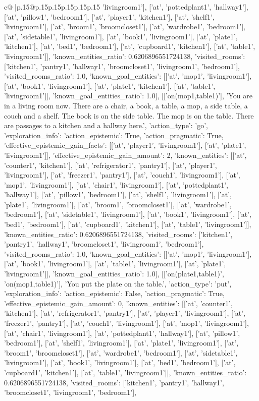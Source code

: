 \documentclass{article}
\begin{document}
{\begin{supertabular}{c@{$\;$}|p{.15\linewidth}@{}p{.15\linewidth}p{.15\linewidth}p{.15\linewidth}p{.15\linewidth}p{.15\linewidth}}
{{{'livingroom1'], ['at', 'pottedplant1', 'hallway1'], ['at', 'pillow1', 'bedroom1'], ['at', 'player1', 'kitchen1'], ['at', 'shelf1', 'livingroom1'], ['at', 'broom1', 'broomcloset1'], ['at', 'wardrobe1', 'bedroom1'], ['at', 'sidetable1', 'livingroom1'], ['at', 'book1', 'livingroom1'], ['at', 'plate1', 'kitchen1'], ['at', 'bed1', 'bedroom1'], ['at', 'cupboard1', 'kitchen1'], ['at', 'table1', 'livingroom1']], 'known_entities_ratio': 0.6206896551724138, 'visited_rooms': ['kitchen1', 'pantry1', 'hallway1', 'broomcloset1', 'livingroom1', 'bedroom1'], 'visited_rooms_ratio': 1.0, 'known_goal_entities': [['at', 'mop1', 'livingroom1'], ['at', 'book1', 'livingroom1'], ['at', 'plate1', 'kitchen1'], ['at', 'table1', 'livingroom1']], 'known_goal_entities_ratio': 1.0}}], [['on(mop1,table1)'], 'You are in a living room now. There are a chair, a book, a table, a mop, a side table, a couch and a shelf. The book is on the side table. The mop is on the table. There are passages to a kitchen and a hallway here.', {'action_type': 'go', 'exploration_info': {'action_epistemic': True, 'action_pragmatic': True, 'effective_epistemic_gain_facts': [['at', 'player1', 'livingroom1'], ['at', 'plate1', 'livingroom1']], 'effective_epistemic_gain_amount': 2, 'known_entities': [['at', 'counter1', 'kitchen1'], ['at', 'refrigerator1', 'pantry1'], ['at', 'player1', 'livingroom1'], ['at', 'freezer1', 'pantry1'], ['at', 'couch1', 'livingroom1'], ['at', 'mop1', 'livingroom1'], ['at', 'chair1', 'livingroom1'], ['at', 'pottedplant1', 'hallway1'], ['at', 'pillow1', 'bedroom1'], ['at', 'shelf1', 'livingroom1'], ['at', 'plate1', 'livingroom1'], ['at', 'broom1', 'broomcloset1'], ['at', 'wardrobe1', 'bedroom1'], ['at', 'sidetable1', 'livingroom1'], ['at', 'book1', 'livingroom1'], ['at', 'bed1', 'bedroom1'], ['at', 'cupboard1', 'kitchen1'], ['at', 'table1', 'livingroom1']], 'known_entities_ratio': 0.6206896551724138, 'visited_rooms': ['kitchen1', 'pantry1', 'hallway1', 'broomcloset1', 'livingroom1', 'bedroom1'], 'visited_rooms_ratio': 1.0, 'known_goal_entities': [['at', 'mop1', 'livingroom1'], ['at', 'book1', 'livingroom1'], ['at', 'table1', 'livingroom1'], ['at', 'plate1', 'livingroom1']], 'known_goal_entities_ratio': 1.0}}], [['on(plate1,table1)', 'on(mop1,table1)'], 'You put the plate on the table.', {'action_type': 'put', 'exploration_info': {'action_epistemic': False, 'action_pragmatic': True, 'effective_epistemic_gain_amount': 0, 'known_entities': [['at', 'counter1', 'kitchen1'], ['at', 'refrigerator1', 'pantry1'], ['at', 'player1', 'livingroom1'], ['at', 'freezer1', 'pantry1'], ['at', 'couch1', 'livingroom1'], ['at', 'mop1', 'livingroom1'], ['at', 'chair1', 'livingroom1'], ['at', 'pottedplant1', 'hallway1'], ['at', 'pillow1', 'bedroom1'], ['at', 'shelf1', 'livingroom1'], ['at', 'plate1', 'livingroom1'], ['at', 'broom1', 'broomcloset1'], ['at', 'wardrobe1', 'bedroom1'], ['at', 'sidetable1', 'livingroom1'], ['at', 'book1', 'livingroom1'], ['at', 'bed1', 'bedroom1'], ['at', 'cupboard1', 'kitchen1'], ['at', 'table1', 'livingroom1']], 'known_entities_ratio': 0.6206896551724138, 'visited_rooms': ['kitchen1', 'pantry1', 'hallway1', 'broomcloset1', 'livingroom1', 'bedroom1'], }}}
\end{supertabular}}
\end{document}
